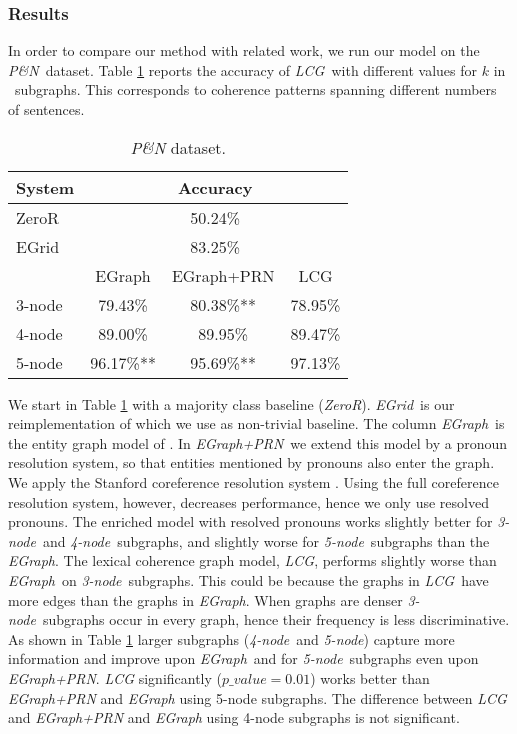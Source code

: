 \subsubsection{Results}
In order to compare our method with related work, we run our model on
the \emph{P\&N}\ dataset. Table \ref{table:pitler} reports the accuracy
of \emph{LCG}\ with different values for $k$ in \knode\
subgraphs. This corresponds to coherence patterns spanning
different numbers of sentences.

\begin{table}[!h]
\centering
\begin{tabular}{lccc}
\hline
System & \multicolumn{3}{c}{Accuracy}\\
\hline
ZeroR & \multicolumn{3}{c}{50.24\%}\\
EGrid	&	\multicolumn{3}{c}{83.25\%}\\\hline
\knode\ & EGraph\hspace*{2mm} & EGraph+PRN\hspace*{2mm}	&  LCG \\\hline
3-node& 79.43\%\hspace*{4mm} & 80.38\%** 		&  78.95\% \\
4-node& 89.00\%\hspace*{4mm} & 89.95\%\hspace*{4mm} 		&  89.47\%  \\
5-node& 96.17\%** 			  & 95.69\%** 					&  97.13\%  \\\hline
\end{tabular}
\caption{\emph{P\&N} dataset.}
\label{table:pitler}
\end{table}


We start in Table \ref{table:pitler} with a majority class baseline
(\emph{ZeroR}). \emph{EGrid}\ is our reimplementation of
 which we use as non-trivial baseline. The column
\emph{EGraph}\ is the entity graph model of \newcite{mesgar15}. In
\emph{EGraph+PRN}\ we extend this model by a pronoun resolution
system, so that entities mentioned by pronouns also enter the
graph. We apply the Stanford coreference resolution system
\cite{leeheeyoung13}. Using the full coreference resolution system,
however, decreases performance, hence we only use resolved
pronouns. The enriched model with resolved pronouns works slightly
better for \emph{3-node}\ and \emph{4-node}\ subgraphs, and slightly
worse for \emph{5-node}\ subgraphs than the \emph{EGraph}. The lexical
coherence graph model, \emph{LCG}, performs slightly worse than
\emph{EGraph}\ on \emph{3-node}\ subgraphs. This could be because the
graphs in \emph{LCG}\ have more edges than the graphs in
\emph{EGraph}. When graphs are denser \emph{3-node}\ subgraphs occur
in every graph, hence their frequency is less discriminative. As shown
in Table \ref{table:pitler} larger subgraphs (\emph{4-node}\ and
\emph{5-node}) capture more information and improve upon
\emph{EGraph}\ and for \emph{5-node}\ subgraphs even upon
\emph{EGraph+PRN}. \emph{LCG} significantly ($p\_value=0.01$) works
better than \emph{EGraph+PRN} and \emph{EGraph} using 5-node
subgraphs. The difference between \emph{LCG} and \emph{EGraph+PRN} and
\emph{EGraph} using 4-node subgraphs is not significant.

